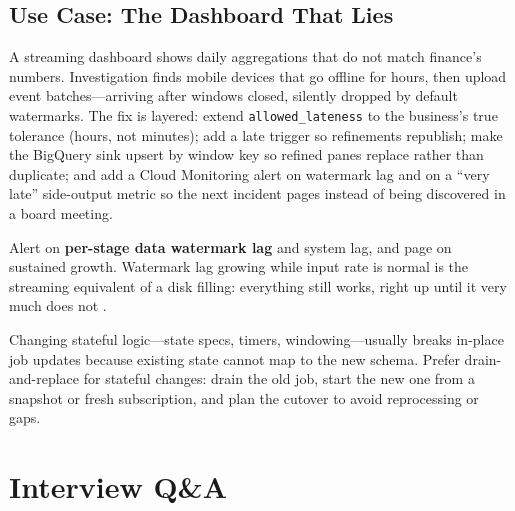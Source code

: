 \subsection{Use Case: The Dashboard That Lies}
A streaming dashboard shows daily aggregations that do not match finance's numbers. Investigation finds mobile devices that go offline for hours, then upload event batches---arriving after windows closed, silently dropped by default watermarks. The fix is layered: extend \texttt{allowed\_lateness} to the business's true tolerance (hours, not minutes); add a late trigger so refinements republish; make the BigQuery sink upsert by window key so refined panes replace rather than duplicate; and add a Cloud Monitoring alert on watermark lag and on a ``very late'' side-output metric so the next incident pages instead of being discovered in a board meeting.

\begin{tipbox}
Alert on \textbf{per-stage data watermark lag} and system lag, and page on sustained growth. Watermark lag growing while input rate is normal is the streaming equivalent of a disk filling: everything still works, right up until it very much does not \cite{googlecloudmonitoringdocs}.
\end{tipbox}

\begin{pitfall}
Changing stateful logic---state specs, timers, windowing---usually breaks in-place job updates because existing state cannot map to the new schema. Prefer drain-and-replace for stateful changes: drain the old job, start the new one from a snapshot or fresh subscription, and plan the cutover to avoid reprocessing or gaps.
\end{pitfall}

\section{Interview Q\&A}
